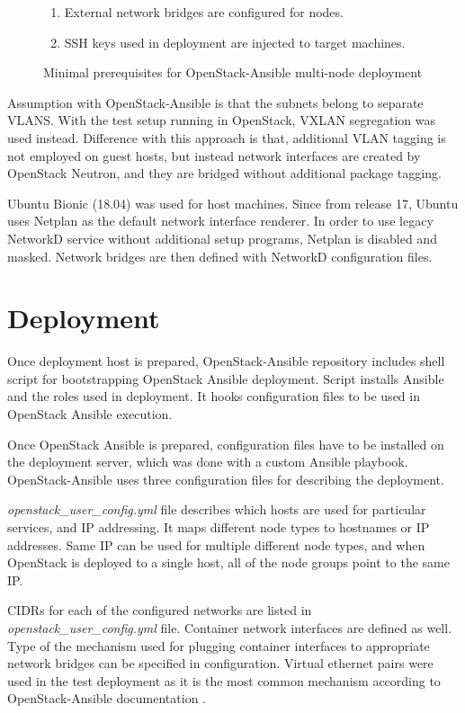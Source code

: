 \documentclass[officiallayout]{tktla}
\begin{document}
\begin{figure}[!b]
\centering
\begin{enumerate}
  \itemsep0em
  \item External network bridges are configured for nodes.
  \item SSH keys used in deployment are injected to target machines.
\end{enumerate}
\caption{Minimal prerequisites for OpenStack-Ansible multi-node deployment}
\label{fig:osa-requirements}
\end{figure}

Assumption with OpenStack-Ansible is that the subnets belong to separate VLANS.
With the test setup running in OpenStack, VXLAN segregation was used instead.
Difference with this approach is that, additional VLAN tagging is not employed
on guest hosts, but instead network interfaces are created by OpenStack
Neutron, and they are bridged without additional package tagging.

Ubuntu Bionic (18.04) was used for host machines. Since from release 17, Ubuntu
uses Netplan \cite{netplan} as the default network interface renderer. In order
to use legacy NetworkD service without additional setup programs, Netplan is
disabled and masked. Network bridges are then defined with NetworkD
configuration files.

\section{Deployment}

Once deployment host is prepared, OpenStack-Ansible repository includes shell
script for bootstrapping OpenStack Ansible deployment. Script installs Ansible
and the roles used in deployment. It hooks configuration files to be used in
OpenStack Ansible execution.

Once OpenStack Ansible is prepared, configuration files have to be installed on
the deployment server, which was done with a custom Ansible playbook.
OpenStack-Ansible uses three configuration files for describing the deployment.

\textit{openstack\_user\_config.yml} file describes which hosts are used for
particular services, and IP addressing. It maps different node types to
hostnames or IP addresses. Same IP can be used for multiple different node
types, and when OpenStack is deployed to a single host, all of the node groups
point to the same IP.

CIDRs for each of the configured networks are listed in
\textit{openstack\_user\_config.yml} file. Container network interfaces are
defined as well. Type of the mechanism used for plugging container interfaces
to appropriate network bridges can be specified in configuration. Virtual
ethernet pairs were used in the test deployment as it is the most common
mechanism according to OpenStack-Ansible documentation
\cite{openstack-ansible}.
\end{document}
